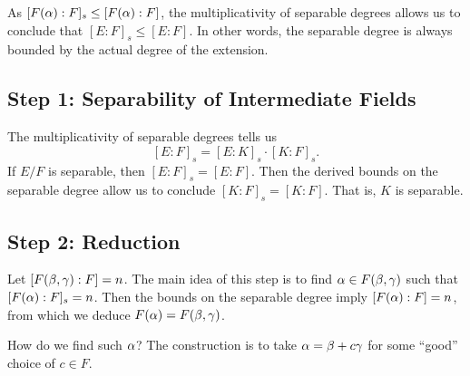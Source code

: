 As $[F(\alpha):F]_s \leq [F(\alpha):F]$, the multiplicativity of separable degrees allows us to conclude that $[E:F]_s \leq [E:F]$. In other words, the separable degree is always bounded by the actual degree of the extension.

\subsection{Step 1: Separability of Intermediate Fields}
The multiplicativity of separable degrees tells us
\[
    [E:F]_s = [E:K]_s \cdot [K:F]_s.
\]
If $E/F$ is separable, then $[E:F]_s = [E:F]$. Then the derived bounds on the separable degree allow us to conclude $[K:F]_s = [K:F]$. That is, $K$ is separable.

\subsection{Step 2: Reduction}
Let $[F(\beta,\gamma):F] = n$. The main idea of this step is to find $\alpha \in F(\beta,\gamma)$ such that $[F(\alpha):F]_s = n$. Then the bounds on the separable degree imply $[F(\alpha):F] = n$, from which we deduce $F(\alpha) = F(\beta,\gamma)$.

How do we find such $\alpha$? The construction is to take $\alpha = \beta + c\gamma$ for some ``good'' choice of $c \in F$.